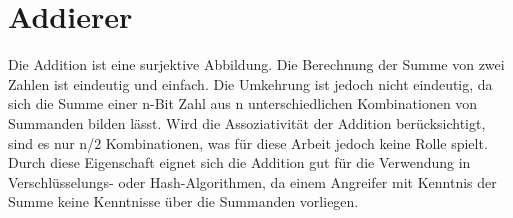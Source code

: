 \section{Addierer}
\label{sec:grundlagen_add}

Die Addition ist eine surjektive Abbildung. Die Berechnung der Summe von zwei Zahlen ist eindeutig und einfach. Die Umkehrung ist jedoch nicht eindeutig,
da sich die Summe einer n-Bit Zahl aus n unterschiedlichen Kombinationen von Summanden bilden lässt. Wird die Assoziativität der Addition berücksichtigt,
sind es nur n/$2$ Kombinationen, was für diese Arbeit jedoch keine Rolle spielt. Durch diese Eigenschaft eignet sich die Addition gut für die Verwendung
in Verschlüsselungs- oder Hash-Algorithmen, da einem Angreifer mit Kenntnis der Summe keine Kenntnisse über die Summanden vorliegen.

